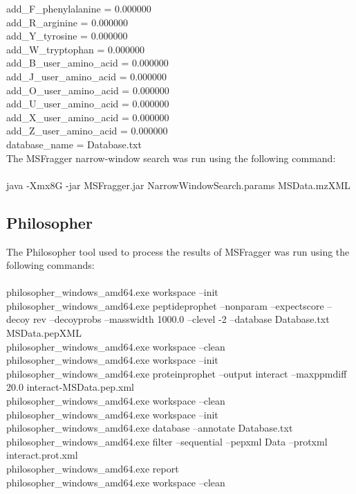 \documentclass [11pt] {article}
\begin{document}
	add\_F\_phenylalanine = 0.000000 \\
	add\_R\_arginine = 0.000000 \\
	add\_Y\_tyrosine = 0.000000 \\
	add\_W\_tryptophan = 0.000000 \\
	add\_B\_user\_amino\_acid = 0.000000 \\
	add\_J\_user\_amino\_acid = 0.000000 \\
	add\_O\_user\_amino\_acid = 0.000000 \\
	add\_U\_user\_amino\_acid = 0.000000 \\
	add\_X\_user\_amino\_acid = 0.000000 \\
	add\_Z\_user\_amino\_acid = 0.000000 \\
	database\_name = Database.txt \\
		
	The MSFragger narrow-window search was run using the following command: \\\\
	java -Xmx8G -jar MSFragger.jar NarrowWindowSearch.params MSData.mzXML
	
	\subsection {Philosopher}
	
	The Philosopher tool used to process the results of MSFragger was run using the following commands: \\\\
	philosopher\_windows\_amd64.exe workspace --init \\
	philosopher\_windows\_amd64.exe peptideprophet --nonparam --expectscore --decoy rev --decoyprobs --masswidth 1000.0 --clevel -2 --database Database.txt MSData.pepXML \\
	philosopher\_windows\_amd64.exe workspace --clean \\
	philosopher\_windows\_amd64.exe workspace --init \\
	philosopher\_windows\_amd64.exe proteinprophet --output interact --maxppmdiff 20.0 interact-MSData.pep.xml \\
	philosopher\_windows\_amd64.exe workspace --clean \\
	philosopher\_windows\_amd64.exe workspace --init \\
	philosopher\_windows\_amd64.exe database --annotate Database.txt \\
	philosopher\_windows\_amd64.exe filter --sequential --pepxml Data --protxml interact.prot.xml \\
	philosopher\_windows\_amd64.exe report \\
	philosopher\_windows\_amd64.exe workspace --clean
	
\end{document}
